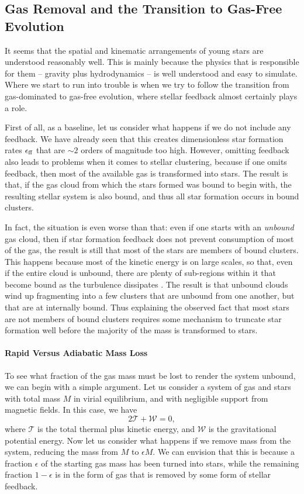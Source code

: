 \subsection{Gas Removal and the Transition to Gas-Free Evolution}

It seems that the spatial and kinematic arrangements of young stars are understood reasonably well. This is mainly because the physics that is responsible for them -- gravity plus hydrodynamics -- is well understood and easy to simulate.  Where we start to run into trouble is when we try to follow the transition from gas-dominated to gas-free evolution, where stellar feedback almost certainly plays a role.

First of all, as a baseline, let us consider what happens if we do not include any feedback. We have already seen that this creates dimensionless star formation rates $\epsilon_{\rm ff}$ that are $\sim 2$ orders of magnitude too high. However, omitting feedback also leads to problems when it comes to stellar clustering, because if one omits feedback, then most of the available gas is transformed into stars. The result is that, if the gas cloud from which the stars formed was bound to begin with, the resulting stellar system is also bound, and thus all star formation occurs in bound clusters.

In fact, the situation is even worse than that: even if one starts with an \textit{unbound} gas cloud, then if star formation feedback does not prevent consumption of most of the gas, the result is still that most of the stars are members of bound clusters. This happens because most of the kinetic energy is on large scales, so that, even if the entire cloud is unbound, there are plenty of sub-regions within it that become bound as the turbulence dissipates \citep{clark04a}. The result is that unbound clouds wind up fragmenting into a few clusters that are unbound from one another, but that are at internally bound. Thus explaining the observed fact that most stars are not members of bound clusters requires some mechanism to truncate star formation well before the majority of the mass is transformed to stars. 

\paragraph{Rapid Versus Adiabatic Mass Loss}

To see what fraction of the gas mass must be lost to render the system unbound, we can begin with a simple argument. Let us consider a system of gas and stars with total mass $M$ in virial equilibrium, and with negligible support from magnetic fields. In this case, we have
\begin{equation}
2\mathcal{T} + \mathcal{W} = 0,
\end{equation}
where $\mathcal{T}$ is the total thermal plus kinetic energy, and $\mathcal{W}$ is the gravitational potential energy. Now let us consider what happens if we remove mass from the system, reducing the mass from $M$ to $\epsilon M$. We can envision that this is because a fraction $\epsilon$ of the starting gas mass has been turned into stars, while the remaining fraction $1-\epsilon$ is in the form of gas that is removed by some form of stellar feedback.

